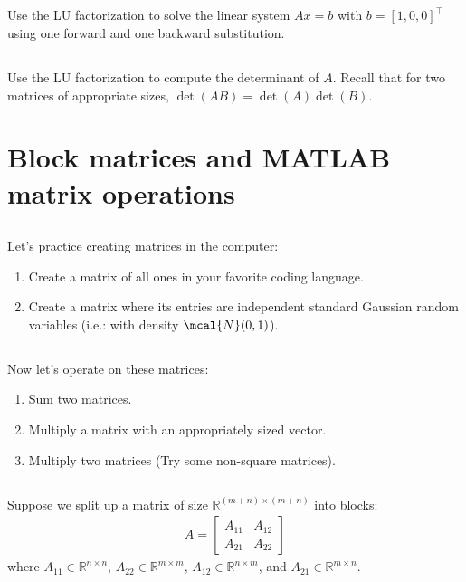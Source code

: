 \documentclass[11pt,letterpaper]{article}
\begin{document}
\subsection{}
Use the LU factorization to solve the linear system $Ax=b$ with
  $b=[1, 0, 0]^\top$ using one forward and one backward substitution.
  
\subsection{}\label{sec:1c}
Use the LU factorization to compute the determinant of
  $A$. Recall that for two matrices of appropriate sizes,
  $\det(AB)=\det(A)\det(B)$.
  

\newpage
\section{Block matrices and MATLAB matrix operations}
\subsection{}
Let's practice creating matrices in the computer:
\begin{enumerate}
    \item Create a matrix of all ones in your favorite coding language.
    \item Create a matrix where its entries are independent standard Gaussian random variables (i.e.: with density $\mcal{N}(0,1)$). 
\end{enumerate}

\subsection{}
Now let's operate on these matrices:
\begin{enumerate}
    \item Sum two matrices.
    \item Multiply a matrix with an appropriately sized vector.
    \item Multiply two matrices (Try some non-square matrices).
\end{enumerate}

\subsection{}
Suppose we split up a matrix of size $\mathbb{R}^{(m+n)\times(m+n)}$ into blocks:
\begin{align*}
    A = \left[\begin{array}{c|c} A_{11} & A_{12} \\\hline A_{21} & A_{22} \end{array}\right]
\end{align*}
where $A_{11}\in\mathbb{R}^{n\times n}$, $A_{22}\in\mathbb{R}^{m\times m}$, $A_{12}\in\mathbb{R}^{n\times m}$, and $A_{21}\in\mathbb{R}^{m\times n}$. 
\end{document}
